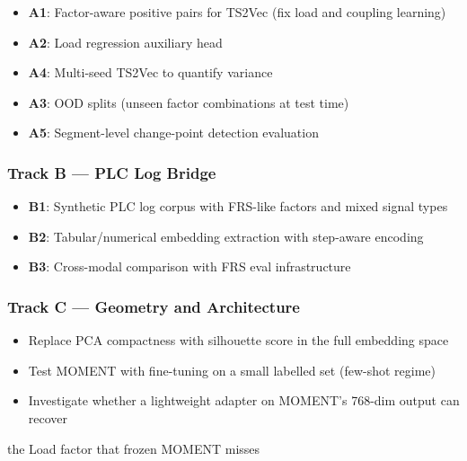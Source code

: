 \documentclass[11pt,a4paper]{article}
\begin{document}
\begin{itemize}
  \item \textbf{A1}: Factor-aware positive pairs for TS2Vec (fix load and coupling learning)
  \item \textbf{A2}: Load regression auxiliary head
  \item \textbf{A4}: Multi-seed TS2Vec to quantify variance
  \item \textbf{A3}: OOD splits (unseen factor combinations at test time)
  \item \textbf{A5}: Segment-level change-point detection evaluation
\end{itemize}

\subsubsection{Track B --- PLC Log Bridge}

\begin{itemize}
  \item \textbf{B1}: Synthetic PLC log corpus with FRS-like factors and mixed signal types
  \item \textbf{B2}: Tabular/numerical embedding extraction with step-aware encoding
  \item \textbf{B3}: Cross-modal comparison with FRS eval infrastructure
\end{itemize}

\subsubsection{Track C --- Geometry and Architecture}

\begin{itemize}
  \item Replace PCA compactness with silhouette score in the full embedding space
  \item Test MOMENT with fine-tuning on a small labelled set (few-shot regime)
  \item Investigate whether a lightweight adapter on MOMENT's 768-dim output can recover
\end{itemize}
  the Load factor that frozen MOMENT misses
\end{document}
